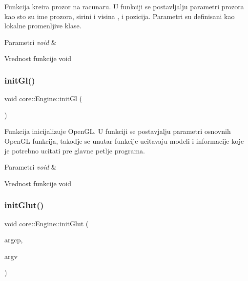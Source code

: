 Funkcija kreira prozor na racunaru. U funkciji se postavljalju parametri prozora kao sto su ime prozora, sirini i visina , i pozicija. Parametri su definisani kao lokalne promenljive klase. 


\begin{DoxyParams}{Parametri}
{\em void} & \\
\hline
\end{DoxyParams}
\begin{DoxyReturn}{Vrednost funkcije}
void 
\end{DoxyReturn}
\mbox{\label{classcore_1_1Engine_a6cfe680acf87f9882f92b1ffc134021f}} 
\subsubsection{\texorpdfstring{init\+Gl()}{initGl()}}
{\footnotesize\ttfamily void core\+::\+Engine\+::init\+Gl (\begin{DoxyParamCaption}\item[{void}]{ }\end{DoxyParamCaption})\hspace{0.3cm}{\ttfamily [private]}}



Funkcija inicijalizuje Open\+GL. U funkciji se postavjalju parametri osnovnih Open\+GL funkcija, takodje se unutar funkcije ucitavaju modeli i informacije koje je potrebno ucitati pre glavne petlje programa. 


\begin{DoxyParams}{Parametri}
{\em void} & \\
\hline
\end{DoxyParams}
\begin{DoxyReturn}{Vrednost funkcije}
void 
\end{DoxyReturn}
\mbox{\label{classcore_1_1Engine_a737de95b00aa5b62c466f2e3dc4edcdb}} 
\subsubsection{\texorpdfstring{init\+Glut()}{initGlut()}}
{\footnotesize\ttfamily void core\+::\+Engine\+::init\+Glut (\begin{DoxyParamCaption}\item[{int $\ast$}]{argcp,  }\item[{char $\ast$$\ast$}]{argv }\end{DoxyParamCaption})\hspace{0.3cm}{\ttfamily [private]}}



